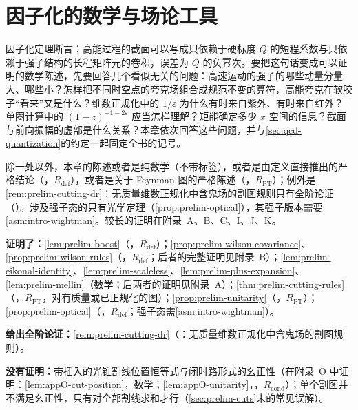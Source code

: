 \chapter{因子化的数学与场论工具}\label{ch:prelim}

因子化定理断言：高能过程的截面可以写成只依赖于硬标度 $Q$ 的短程系数与只依赖于强子结构的长程矩阵元的卷积，误差为 $Q$ 的负幂次。要把这句话变成可以证明的数学陈述，先要回答几个看似无关的问题：高速运动的强子的哪些动量分量大、哪些小？怎样把不同时空点的夸克场组合成规范不变的算符，高能夸克在软胶子“看来”又是什么？维数正规化中的 $1/\varepsilon$ 为什么有时来自紫外、有时来自红外？单圈计算中的 $(1-z)^{-1-2\varepsilon}$ 应当怎样理解？矩能确定多少 $x$ 空间的信息？截面与前向振幅的虚部是什么关系？本章依次回答这些问题，并与\cref{sec:qcd-quantization}的约定一起固定全书的记号。

除一处以外，本章的陈述或者是纯数学（不带标签），或者是由定义直接推出的严格结论（\tagR，$R_{\mathrm{def}}$），或者是关于 Feynman 图的严格陈述（\tagR，$R_{\mathrm{PT}}$）；例外是\cref{rem:prelim-cutting-dr}：无质量维数正规化中含鬼场的割图规则只有全阶论证（\tagA）。涉及强子态的只有光学定理（\cref{prop:prelim-optical}），其强子版本需要\cref{asm:intro-wightman}。较长的证明在附录~A、B、C、I、J、K。

\begin{tcolorbox}[enhanced,breakable,title=本章证明了什么／没有证明什么,fonttitle=\bfseries,
  colback=gray!3!white,colframe=gray!55!black,boxrule=0.6pt,arc=2pt,
  left=5pt,right=5pt,top=3pt,bottom=3pt,before skip=6pt,after skip=6pt]
\textbf{证明了：}\cref{lem:prelim-boost}（\tagR，$R_{\mathrm{def}}$）；\cref{prop:prelim-wilson-covariance}、\cref{prop:prelim-wilson-rules}（\tagR，$R_{\mathrm{def}}$；后者的完整证明见附录~B）；\cref{lem:prelim-eikonal-identity}、\cref{lem:prelim-scaleless}、\cref{lem:prelim-plus-expansion}、\cref{lem:prelim-mellin}（数学；后两者的证明见附录~A）；\cref{thm:prelim-cutting-rules}（\tagR，$R_{\mathrm{PT}}$，对有质量或已正规化的图）；\cref{prop:prelim-unitarity}（\tagR，$R_{\mathrm{PT}}$）；\cref{prop:prelim-optical}（\tagR，$R_{\mathrm{def}}$；强子态需\cref{asm:intro-wightman}）。\par
\textbf{给出全阶论证：}\cref{rem:prelim-cutting-dr}（\tagA：无质量维数正规化中含鬼场的割图规则）。\par
\textbf{没有证明：}带插入的光锥割线位置恒等式与闭时路形式的幺正性（在附录~O 中证明：\cref{lem:appO-cut-position}，数学；\cref{lem:appO-unitarity}，\tagR，$R_{\mathrm{cond}}$）；单个割图并不满足幺正性，只有对全部割线求和才行（\cref{sec:prelim-cuts}末的常见误解）。
\end{tcolorbox}

